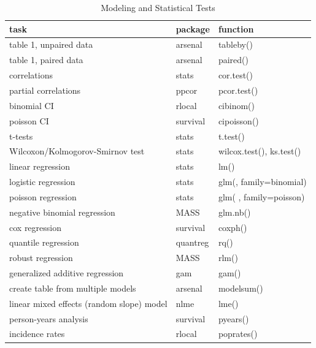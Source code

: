 \documentclass[
]{book}
\begin{document}
\begin{table}

\caption{\label{tab:unnamed-chunk-4}Modeling and Statistical Tests}
\centering
\begin{tabular}[t]{l|l|l}
\hline
task & package & function\\
\hline
table 1, unpaired data & arsenal & tableby()\\
\hline
table 1, paired data & arsenal & paired()\\
\hline
correlations & stats & cor.test()\\
\hline
partial correlations & ppcor & pcor.test()\\
\hline
binomial CI & rlocal & cibinom()\\
\hline
poisson CI & survival & cipoisson()\\
\hline
t-tests & stats & t.test()\\
\hline
Wilcoxon/Kolmogorov-Smirnov test & stats & wilcox.test(), ks.test()\\
\hline
linear regression & stats & lm()\\
\hline
logistic regression & stats & glm(, family=binomial)\\
\hline
poisson regression & stats & glm( , family=poisson)\\
\hline
negative binomial regression & MASS & glm.nb()\\
\hline
cox regression & survival & coxph()\\
\hline
quantile regression & quantreg & rq()\\
\hline
robust regression & MASS & rlm()\\
\hline
generalized additive regression & gam & gam()\\
\hline
create table from multiple models & arsenal & modelsum()\\
\hline
linear mixed effects (random slope) model & nlme & lme()\\
\hline
person-years analysis & survival & pyears()\\
\hline
incidence rates & rlocal & poprates()\\
\hline
\end{tabular}
\end{table}

  

\printindex
\end{document}
